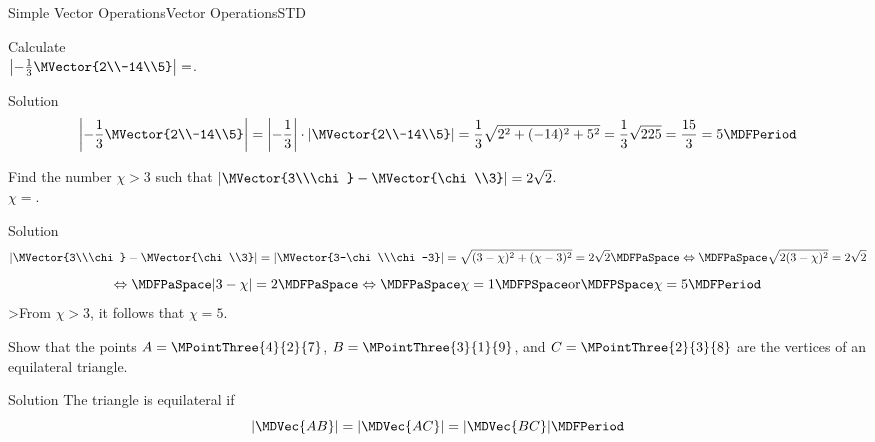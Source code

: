 \begin{MXContent}{Simple Vector Operations}{Vector Operations}{STD}
\begin{MExample}
\end{MExample}

\begin{MExercise}
Calculate\\
$\left|-\frac{1}{3}\MVector{2\\-14\\5}\right|=$.
\begin{MHint}{Solution}
\[
 \left|-\frac{1}{3}\MVector{2\\-14\\5}\right|=\left|-\frac{1}{3}\right|\cdot\left|\MVector{2\\-14\\5}\right|=\frac{1}{3}\sqrt{2^2+(-14)^2+5^2}=\frac{1}{3}\sqrt{225}=\frac{15}{3}=5 \MDFPeriod
\]
 
\end{MHint}

\end{MExercise}


\begin{MExercise}
Find the number $\chi>3$ such that $\left|\MVector{3\\\chi}-\MVector{\chi\\3}\right|=2\sqrt{2}$.\\
$\chi=$.
\end{MExercise}

\begin{MHint}{Solution}
\[
\left|\MVector{3\\\chi}-\MVector{\chi\\3}\right| =\left|\MVector{3-\chi\\\chi-3}\right|=\sqrt{(3-\chi)^2+(\chi-3)^2}=2\sqrt{2}\MDFPaSpace\Leftrightarrow\MDFPaSpace\sqrt{2(3-\chi)^2}=2\sqrt{2}
\]
\[
 \Leftrightarrow\MDFPaSpace|3-\chi|=2\MDFPaSpace\Leftrightarrow\MDFPaSpace\chi=1\MDFPSpace\textrm{or}\MDFPSpace\chi=5 \MDFPeriod
\]
>From $\chi>3$, it follows that $\chi=5$.
\end{MHint}

\begin{MExercise}
Show that the points $A=\MPointThree{4}{2}{7}$, $B=\MPointThree{3}{1}{9}$, and $C=\MPointThree{2}{3}{8}$ 
are the vertices of an equilateral triangle.
\end{MExercise}

\begin{MHint}{Solution}
The triangle is equilateral if
\[
 |\MDVec{A B}| = |\MDVec{A C}| = |\MDVec{B C}| \MDFPeriod
\]


\end{MHint}
\end{MXContent}
